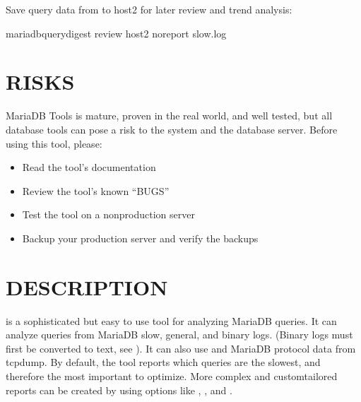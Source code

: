 \documentclass[letterpaper,10pt,english]{sphinxmanual}
\begin{document}
Save query data from  to host2 for later review and trend analysis:

\begin{sphinxVerbatim}[commandchars=\\\{\}]
mariadb\PYGZhy{}query\PYGZhy{}digest \PYGZhy{}\PYGZhy{}review host2 \PYGZhy{}\PYGZhy{}no\PYGZhy{}report slow.log
\end{sphinxVerbatim}


\section{RISKS}
\label{\detokenize{mariadb-query-digest:risks}}
MariaDB Tools is mature, proven in the real world, and well tested,
but all database tools can pose a risk to the system and the database
server.  Before using this tool, please:
\begin{itemize}
\item {} 
Read the tool’s documentation

\item {} 
Review the tool’s known “BUGS”

\item {} 
Test the tool on a non\sphinxhyphen{}production server

\item {} 
Backup your production server and verify the backups

\end{itemize}


\section{DESCRIPTION}
\label{\detokenize{mariadb-query-digest:description}}
 is a sophisticated but easy to use tool for analyzing
MariaDB queries.  It can analyze queries from MariaDB slow, general, and binary
logs. (Binary logs must first be converted to text, see {\hyperref[\detokenize{mariadb-query-digest:cmdoption-mariadb-query-digest-type}]{}}).
It can also use  and MariaDB protocol data from tcpdump.
By default, the tool reports which queries are the slowest, and therefore
the most important to optimize.  More complex and custom\sphinxhyphen{}tailored reports
can be created by using options like {\hyperref[\detokenize{mariadb-query-digest:cmdoption-mariadb-query-digest-group-by}]{}}, {\hyperref[\detokenize{mariadb-query-digest:cmdoption-mariadb-query-digest-filter}]{}}, and
{\hyperref[\detokenize{mariadb-query-digest:cmdoption-mariadb-query-digest-embedded-attributes}]{}}.
\end{document}
